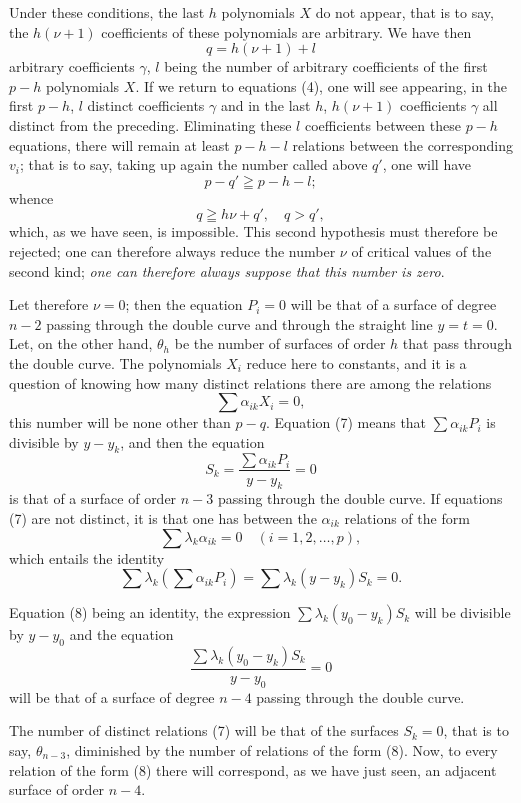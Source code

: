 \documentclass{article}
\begin{document}
Under these conditions, the last $h$ polynomials $X$ do not appear, that is to say, the $h(\nu + 1)$ coefficients of these polynomials are
arbitrary. We have then
\[
q = h(\nu + 1) + l
\]
arbitrary coefficients $\gamma$, $l$ being the number of arbitrary coefficients of the first $p - h$ polynomials $X$. If we return to equations (4), one will see appearing, in the first $p - h$, $l$ distinct coefficients $\gamma$ and in the last $h$, $h(\nu + 1)$ coefficients $\gamma$ all distinct from the preceding. Eliminating these $l$ coefficients between these $p - h$ equations, there will remain at least $p - h - l$ relations between the corresponding $v_{i}$; that is to say, taking up again the number called above $q'$, one will have
\[
p - q' \geqq p - h - l;
\]
whence
\[
q \geqq h\nu + q', \quad q > q',
\]
which, as we have seen, is impossible. This second hypothesis must therefore be rejected; one can therefore always reduce the number $\nu$ of critical values of the second kind; \emph{one can therefore always suppose that this number is zero}.

Let therefore $\nu = 0$; then the equation $P_{i} = 0$ will be that of a surface of degree $n - 2$ passing through the double curve and through the straight line $y = t = 0$. Let, on the other hand, $\theta_{h}$ be the number of surfaces of order $h$ that pass through the double curve. The polynomials $X_{i}$ reduce here to constants, and it is a question of knowing how many distinct relations there are among the relations
\[
\sum \alpha_{ik} X_{i} = 0, \tag{7}
\]
this number will be none other than $p - q$. Equation (7) means that $\displaystyle\sum \alpha_{ik} P_{i}$ is divisible by $y - y_{k}$, and then the equation
\[
S_{k} = \frac{\sum \alpha_{ik} P_{i}}{y - y_{k}} = 0
\]
is that of a surface of order $n - 3$ passing through the double curve. If equations (7) are not distinct, it is that one has between the $\alpha_{ik}$
relations of the form
\[
\sum \lambda_{k}\alpha_{ik} = 0 \quad (i = 1, 2, \ldots, p), \tag{8}
\]
which entails the identity
\[
\sum \lambda_{k}\left(\sum \alpha_{ik} P_{i}\right) = \sum \lambda_{k}(y - y_{k}) S_{k} = 0. \tag{9}
\]

Equation (8) being an identity, the expression $\displaystyle\sum \lambda_{k}(y_{0} - y_{k})S_{k}$ will be divisible by $y - y_{0}$ and the equation
\[
\frac{\sum \lambda_{k}(y_{0} - y_{k})S_{k}}{y - y_{0}} = 0 \tag{10}
\]
will be that of a surface of degree $n - 4$ passing through the double curve.

The number of distinct relations (7) will be that of the surfaces $S_{k} = 0$, that is to say, $\theta_{n-3}$, diminished by the number of relations of the form (8). Now, to every relation of the form (8) there will correspond, as we have just seen, an adjacent surface of order $n - 4$.
\end{document}
